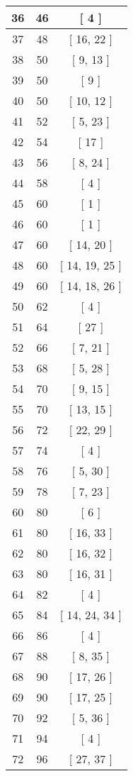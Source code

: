 \begin{center}
\begin{longtable}[H]{|| c c c ||}
\hline
36 & 46 & [ 4 ] \\ 
\hline
37 & 48 & [ 16, 22 ] \\ 
\hline
38 & 50 & [ 9, 13 ] \\ 
\hline
39 & 50 & [ 9 ] \\ 
\hline
40 & 50 & [ 10, 12 ] \\ 
\hline
41 & 52 & [ 5, 23 ] \\ 
\hline
42 & 54 & [ 17 ] \\ 
\hline
43 & 56 & [ 8, 24 ] \\ 
\hline
44 & 58 & [ 4 ] \\ 
\hline
45 & 60 & [ 1 ] \\ 
\hline
46 & 60 & [ 1 ] \\ 
\hline
47 & 60 & [ 14, 20 ] \\ 
\hline
48 & 60 & [ 14, 19, 25 ] \\ 
\hline
49 & 60 & [ 14, 18, 26 ] \\ 
\hline
50 & 62 & [ 4 ] \\ 
\hline
51 & 64 & [ 27 ] \\ 
\hline
52 & 66 & [ 7, 21 ] \\ 
\hline
53 & 68 & [ 5, 28 ] \\ 
\hline
54 & 70 & [ 9, 15 ] \\ 
\hline
55 & 70 & [ 13, 15 ] \\ 
\hline
56 & 72 & [ 22, 29 ] \\ 
\hline
57 & 74 & [ 4 ] \\ 
\hline
58 & 76 & [ 5, 30 ] \\ 
\hline
59 & 78 & [ 7, 23 ] \\ 
\hline
60 & 80 & [ 6 ] \\ 
\hline
61 & 80 & [ 16, 33 ] \\ 
\hline
62 & 80 & [ 16, 32 ] \\ 
\hline
63 & 80 & [ 16, 31 ] \\ 
\hline
64 & 82 & [ 4 ] \\ 
\hline
65 & 84 & [ 14, 24, 34 ] \\ 
\hline
66 & 86 & [ 4 ] \\ 
\hline
67 & 88 & [ 8, 35 ] \\ 
\hline
68 & 90 & [ 17, 26 ] \\ 
\hline
69 & 90 & [ 17, 25 ] \\ 
\hline
70 & 92 & [ 5, 36 ] \\ 
\hline
71 & 94 & [ 4 ] \\ 
\hline
72 & 96 & [ 27, 37 ] \\ 

\end{longtable}
\end{center}
